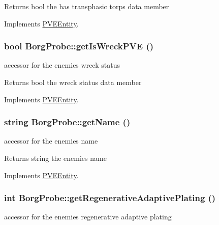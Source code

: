 \begin{DoxyReturn}{Returns}
bool the has transphasic torps data member 
\end{DoxyReturn}


Implements \hyperlink{classPVEEntity}{PVEEntity}.

\hypertarget{classBorgProbe_ab3a53f7518386129055fa678d75f99a5}{
\subsubsection[{getIsWreckPVE}]{\setlength{\rightskip}{0pt plus 5cm}bool BorgProbe::getIsWreckPVE ()}}
\label{db/deb/classBorgProbe_ab3a53f7518386129055fa678d75f99a5}
accessor for the enemies wreck status

\begin{DoxyReturn}{Returns}
bool the wreck status data member 
\end{DoxyReturn}


Implements \hyperlink{classPVEEntity}{PVEEntity}.

\hypertarget{classBorgProbe_a93662b939b7b3565c72445f75c56c101}{
\subsubsection[{getName}]{\setlength{\rightskip}{0pt plus 5cm}string BorgProbe::getName ()}}
\label{db/deb/classBorgProbe_a93662b939b7b3565c72445f75c56c101}
accessor for the enemies name

\begin{DoxyReturn}{Returns}
string the enemies name 
\end{DoxyReturn}


Implements \hyperlink{classPVEEntity}{PVEEntity}.

\hypertarget{classBorgProbe_ab2bd1c4edaae54e53ebec17b4680b11b}{
\subsubsection[{getRegenerativeAdaptivePlating}]{\setlength{\rightskip}{0pt plus 5cm}int BorgProbe::getRegenerativeAdaptivePlating ()}}
\label{db/deb/classBorgProbe_ab2bd1c4edaae54e53ebec17b4680b11b}
accessor for the enemies regenerative adaptive plating


